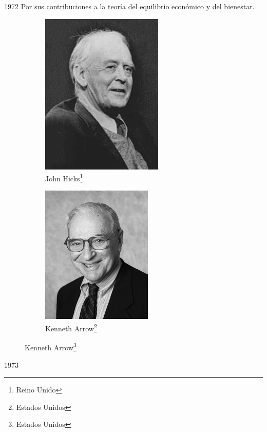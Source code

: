 \documentclass[aspectratio=169]{beamer}
\begin{document}
        \begin{frame}[t]{1972}
            \justify
            Por sus contribuciones a la teoría del equilibrio económico y del bienestar.
            \begin{figure}[ht]
                \centering
                \caption{Ganadores del Premio Nobel de Economía en 1972}
                \begin{subfigure}[b]{0.49\textwidth}
                    \centering
                    \includegraphics[scale = 0.35]{ImgEconomy/JohnHicks.jpg}
                    \caption{John Hicks\footnote{Reino Unido}}
                    \label{fig: JohnHicks}
                \end{subfigure}
                \hfill 
                \begin{subfigure}[b]{0.49\textwidth}
                    \centering
                    \includegraphics[scale = 1.7]{ImgEconomy/KennethArrow.jpg}
                    \caption{Kenneth Arrow\footnote{Estados Unidos}}
                    \label{fig: KennethArrow}
                \end{subfigure}
                \label{fig: Ganadores1972}
            \end{figure}
        \end{frame}
        \begin{frame}[t]{1973}
            
        \end{frame}


    
\end{document}
